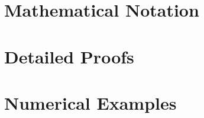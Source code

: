 \documentclass[11pt,twoside]{article}
\begin{document}



\appendix

\section{Mathematical Notation}


\section{Detailed Proofs}


\section{Numerical Examples}

\end{document}
